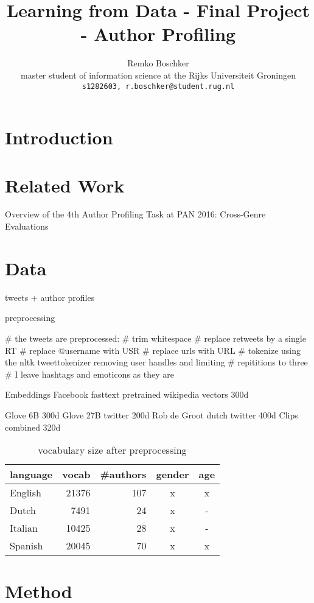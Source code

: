 \documentclass[11pt]{article}
\title{Learning from Data - Final Project - Author Profiling}
\author{Remko Boschker \\
  master student of information science at the Rijks Universiteit Groningen \\
  {\tt s1282603, r.boschker@student.rug.nl} }
\date{}
\begin{document}
\maketitle
\begin{abstract}

\end{abstract}

\section{Introduction}

\section{Related Work}

Overview of the 4th Author Profiling Task at PAN 2016:
Cross-Genre Evaluations

\section{Data}

tweets + author profiles

preprocessing

# the tweets are preprocessed:
# trim whitespace
# replace retweets by a single RT
# replace @username with USR
# replace urls with URL
# tokenize using the nltk tweettokenizer removing user handles and limiting
#   repititions to three
# I leave hashtags and emoticons as they are

Embeddings
Facebook fasttext pretrained wikipedia vectors 300d

Glove 6B 300d
Glove 27B twitter 200d
Rob de Groot dutch twitter 400d
Clips combined 320d

\begin{table}[ht]
  \caption{vocabulary size after preprocessing}
  \label{tab:vocab-size}
  \begin{tabular}{ l r r c c }
    language & vocab & #authors & gender & age \\
    \hline
    English & 21376 & 107 & x & x \\
    Dutch   &  7491 &  24 & x & - \\
    Italian & 10425 &  28 & x & - \\
    Spanish & 20045 &  70 & x & x \\
  \end{tabular}
\end{table}

\section{Method}
\end{document}

